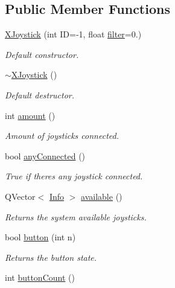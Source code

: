 \subsection*{Public Member Functions}
\begin{DoxyCompactItemize}
\item 
\hyperlink{class_x_joystick_a1d4f55adbffae86916947f248c9e5454}{X\+Joystick} (int I\+D=-\/1, float \hyperlink{class_x_joystick_a49901d35007803e1d88cf3eb382e4473}{filter}=0.)
\begin{DoxyCompactList}\small\item\em Default constructor. \end{DoxyCompactList}\item 
\hyperlink{class_x_joystick_a14ebfadbb78639e533368c620f8cdcb8}{$\sim$\+X\+Joystick} ()
\begin{DoxyCompactList}\small\item\em Default destructor. \end{DoxyCompactList}\item 
int \hyperlink{class_x_joystick_a1b65862348fb552e9607c37e1bd2a90d}{amount} ()
\begin{DoxyCompactList}\small\item\em Amount of joysticks connected. \end{DoxyCompactList}\item 
bool \hyperlink{class_x_joystick_a8323d85b5923ee80e619e685267d9e18}{any\+Connected} ()
\begin{DoxyCompactList}\small\item\em True if there\textquotesingle{}s any joystick connected. \end{DoxyCompactList}\item 
Q\+Vector$<$ \hyperlink{struct_x_joystick_1_1_info}{Info} $>$ \hyperlink{class_x_joystick_ab8e3e56c7b8f6f0dec911f351b4b361e}{available} ()
\begin{DoxyCompactList}\small\item\em Returns the system available joysticks. \end{DoxyCompactList}\item 
bool \hyperlink{class_x_joystick_ad501613a09d6fc07a7054b8d6a8e83f1}{button} (int n)
\begin{DoxyCompactList}\small\item\em Returns the button state. \end{DoxyCompactList}\item 
int \hyperlink{class_x_joystick_afb2d3fd919ba601fa8709bb97e1e0d48}{button\+Count} ()

\end{DoxyCompactItemize}
